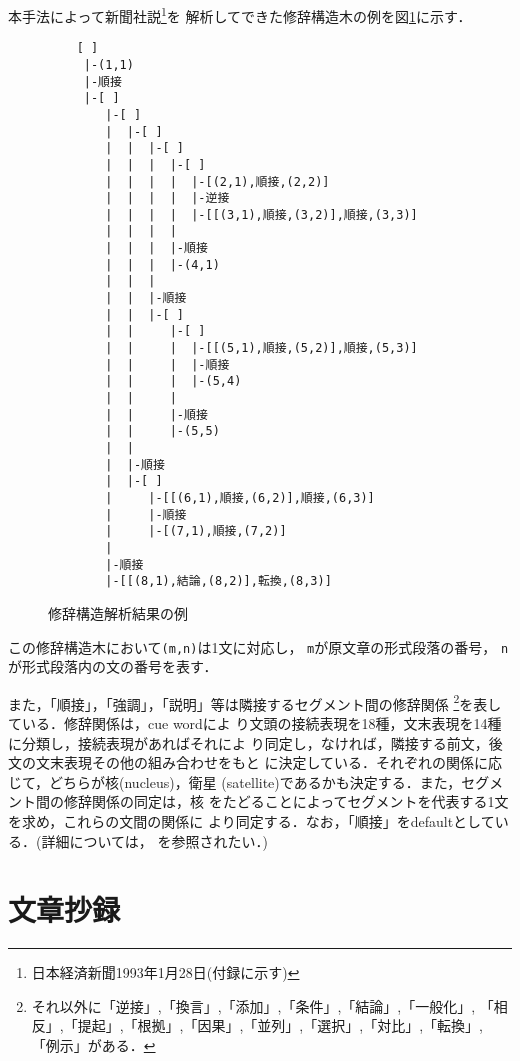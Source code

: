 本手法によって新聞社説\footnote{日本経済新聞1993年1月28日(付録に示す)}を
解析してできた修辞構造木の例を図\ref{fig:tb_tree}に示す．

\begin{figure}[htb]
 \begin{center}
  {\footnotesize
  {\baselineskip=11pt
  \begin{verbatim}      
    [ ]
     |-(1,1)
     |-順接
     |-[ ]
        |-[ ]
        |  |-[ ]
        |  |  |-[ ]
        |  |  |  |-[ ]
        |  |  |  |  |-[(2,1),順接,(2,2)]
        |  |  |  |  |-逆接
        |  |  |  |  |-[[(3,1),順接,(3,2)],順接,(3,3)]
        |  |  |  |
        |  |  |  |-順接
        |  |  |  |-(4,1)
        |  |  |  
        |  |  |-順接
        |  |  |-[ ]
        |  |     |-[ ]
        |  |     |  |-[[(5,1),順接,(5,2)],順接,(5,3)]
        |  |     |  |-順接
        |  |     |  |-(5,4)
        |  |     |
        |  |     |-順接
        |  |     |-(5,5)
        |  |
        |  |-順接
        |  |-[ ]
        |     |-[[(6,1),順接,(6,2)],順接,(6,3)]
        |     |-順接
        |     |-[(7,1),順接,(7,2)]
        |
        |-順接
        |-[[(8,1),結論,(8,2)],転換,(8,3)]
  \end{verbatim}
  \caption{修辞構造解析結果の例}
  \label{fig:tb_tree}
  }}
 \end{center}
\end{figure}

この修辞構造木において\verb|(m,n)|は1文に対応し，
\verb|m|が原文章の形式段落の番号，
\verb|n|が形式段落内の文の番号を表す．

また，「順接」，「強調」，「説明」等は隣接するセグメント間の修辞関係
\footnote{それ以外に「逆接」,「換言」,「添加」,「条件」,「結論」,「一般化」,
「相反」,「提起」,「根拠」,「因果」,「並列」,「選択」,「対比」,「転換」,
「例示」がある．}を表している\cite{Mann:87:a}．修辞関係は，cue wordによ
り文頭の接続表現を18種，文末表現を14種に分類し，接続表現があればそれによ
り同定し，なければ，隣接する前文，後文の文末表現その他の組み合わせをもと
に決定している．それぞれの関係に応じて，どちらが核(nucleus)，衛星
(satellite)であるかも決定する．また，セグメント間の修辞関係の同定は，核
をたどることによってセグメントを代表する1文を求め，これらの文間の関係に
より同定する．なお，「順接」をdefaultとしている．(詳細については，
\cite{Tamura:98}を参照されたい．)

\section{文章抄録}\label{shouroku}

